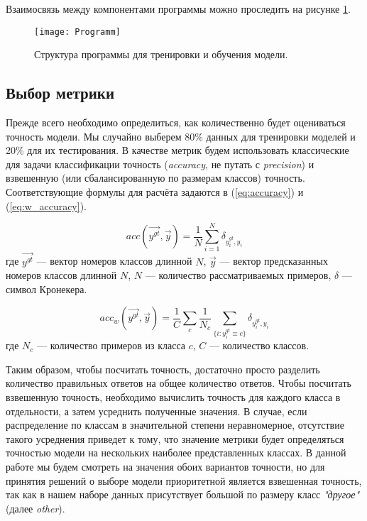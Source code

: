  \indent
 \indent
 Взаимосвязь между компонентами программы можно проследить на 
  рисунке \ref{tikzpicture: programm}.

\begin{figure}[h!]
    \begin{center}
   	    \texttt{[image: Programm]}
   	\end{center}
   	\caption{Структура программы для тренировки и обучения модели.}
   	\label{tikzpicture: programm}
\end{figure}


\subsection{Выбор метрики}

\indent
\indent
Прежде всего необходимо определиться, как количественно будет оцениваться
точность модели. Мы случайно выберем 80\% данных 
для тренировки моделей и 
20\% для их тестирования. В качестве метрик будем использовать 
классические для задачи классификации точность
 (\textit{accuracy}, не путать с \textit{precision}) и взвешенную (или
 сбалансированную по размерам классов) точность. Соответствующие 
формулы для расчёта задаются в (\ref{eq:accuracy}) и (\ref{eq:w_accuracy}).


\begin{equation}\label{eq:accuracy}
	   acc(\vec{y^{gt}}, \vec{y}) = \frac{1}{N}\sum_{i=1}^{N} \delta_{y_i^{gt}, y_i}
\end{equation}
где $\vec{y^{gt}}$ --- вектор номеров классов длинной $N$, 
$\vec{y}$ --- вектор предсказанных номеров классов длинной $N$,
$N$ --- количество рассматриваемых примеров,
$\delta$ --- символ Кронекера.

\begin{equation}\label{eq:w_accuracy}
	   acc_w(\vec{y^{gt}}, \vec{y}) = 
	   \frac{1}{C} \sum_{c}
	   \frac{1}{N_c}\sum_{\{i: y_i^{gt}\equiv c\}} \delta_{y_i^{gt}, y_i}
\end{equation}
где $N_c$ --- количество примеров из класса $c$, $C$ --- количество классов.
 

\indent
\indent
Таким образом, чтобы посчитать точность, достаточно просто разделить
количество правильных ответов на общее количество ответов. Чтобы посчитать
взвешенную точность, необходимо вычислить точность для каждого класса
в отдельности, а затем усреднить полученные значения. В случае, если распределение
по классам в значительной степени неравномерное, отсутствие такого усреднения
приведет к тому, что значение метрики будет определяться точностью модели на
нескольких наиболее представленных классах. В данной работе мы будем
смотреть на значения обоих вариантов точности, но для принятия
решений о выборе модели приоритетной является взвешенная точность, так как в нашем наборе данных присутствует большой по размеру класс \textit{"другое"} (далее \textit{other}).


